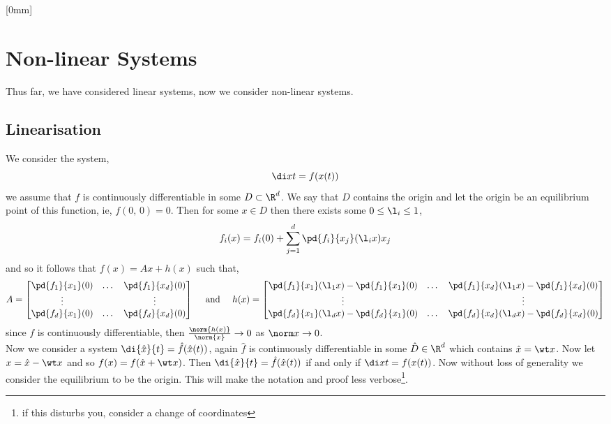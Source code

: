 
[0mm]
\section{Non-linear Systems}
Thus far, we have considered linear systems, now we consider non-linear systems.

\subsection{Linearisation}
We consider the system,
$$ \di x t = f(x(t)) $$
we assume that $f$ is continuously differentiable in some $D \subset \R^d$. We say that $D$ contains the origin and let the origin be an equilibrium point of this function, ie, $f(0,\,0)=0$. Then for some $x \in D$ then there exists some $0 \le \l_i \le 1$,
$$ f_i(x) = f_i(0) + \sum_{j=1}^d \pd{f_i}{x_j}(\l_ix)x_j  $$
and so it follows that $f(x) = Ax + h(x)$ such that,
$$ A = \begin{bmatrix}
  \pd{f_1}{x_1}(0) & \dots & \pd{f_1}{x_d}(0) \\
  \vdots && \vdots \\
  \pd{f_d}{x_1}(0) & \dots & \pd{f_d}{x_d}(0)
\end{bmatrix} \quad \text{ and } \quad h(x) = \begin{bmatrix}
  \pd{f_1}{x_1}(\l_1x) - \pd{f_1}{x_1}(0) & \dots & \pd{f_1}{x_d}(\l_1x) - \pd{f_1}{x_d}(0) \\
  \vdots && \vdots \\
  \pd{f_d}{x_1}(\l_d x) - \pd{f_d}{x_1}(0) & \dots & \pd{f_d}{x_d}(\l_dx) - \pd{f_d}{x_d}(0)
\end{bmatrix} $$
since $f$ is continuously differentiable, then $\frac{\norm{h(x)}}{\norm{x}} \to 0$ as $\norm x \to 0$.\\

Now we consider a system $\di{\hat x}{t} = \hat f(\hat x (t))$, again $\hat f$ is continuously differentiable in some $\hat D \in \R^d$ which contains $\hat x = \wt x$. Now let $x = \hat x - \wt x$ and so $f(x) = f(\hat x + \wt x)$. Then $\di{\hat x}{t} = \hat f(\hat x (t))$ if and only if $\di x t = f(x(t))$. Now without loss of generality we consider the equilibrium to be the origin. This will make the notation and proof less verbose\footnote{if this disturbs you, consider a change of coordinates}.\\

